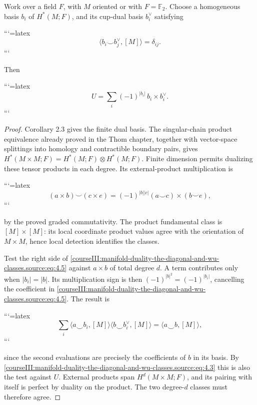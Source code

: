 \begin{theorem}
Work over a field \(F\), with \(M\) oriented or with \(F=\mathbb F _2\). Choose a homogeneous basis \(b_i\) of \(H^*(M;F)\), and its cup-dual basis \(b_i^\vee\) satisfying


```{=latex}
\[
\langle b_i\smile b_j^\vee,[M]\rangle=\delta_{ij}.
\]
```


Then


```{=latex}
\begin{equation}
U=\sum_i(-1)^{|b_i|}\,b_i\times b_i^\vee.
\label{courseIII:manifold-duality-the-diagonal-and-wu-classes.source:eq:4.5}
\end{equation}
```


\end{theorem}
\begin{proof}
Corollary 2.3 gives the finite dual basis. The singular-chain product equivalence already proved in the Thom chapter, together with vector-space splittings into homology and contractible boundary pairs, gives
\(H^*(M\times M;F)=H^*(M;F)\otimes H^*(M;F)\).
Finite dimension permits dualizing these tensor products in each degree. Its external-product multiplication is


```{=latex}
\[
(a\times b)\smile(c\times e)=(-1)^{|b||c|}(a\smile c)\times(b\smile e),
\]
```


by the proved graded commutativity. The product fundamental class is \([M]\times[M]\): its local coordinate product values agree with the orientation of \(M\times M\), hence local detection identifies the classes.

Test the right side of \eqref{courseIII:manifold-duality-the-diagonal-and-wu-classes.source:eq:4.5} against \(a\times b\) of total degree \(d\). A term contributes only when \(|b_i|=|b|\). Its multiplication sign is then \((-1)^{|b|^2}=(-1)^{|b_i|}\), cancelling the coefficient in \eqref{courseIII:manifold-duality-the-diagonal-and-wu-classes.source:eq:4.5}. The result is


```{=latex}
\[
\sum_i\langle a\smile b_i,[M]\rangle\langle b\smile b_i^\vee,[M]\rangle
=\langle a\smile b,[M]\rangle,
\]
```


since the second evaluations are precisely the coefficients of \(b\) in its basis. By \eqref{courseIII:manifold-duality-the-diagonal-and-wu-classes.source:eq:4.3} this is also the test against \(U\). External products span \(H^d(M\times M;F)\), and its pairing with itself is perfect by duality on the product. The two degree-\(d\) classes must therefore agree.
\end{proof}

